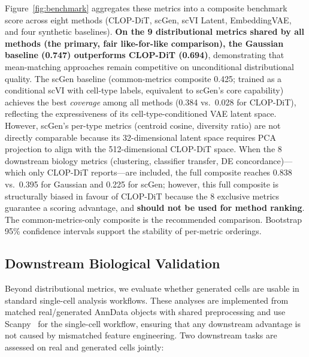 \documentclass[genes,article,submit,pdftex,oneauthor]{Definitions/mdpi}
\begin{document}
Figure~\ref{fig:benchmark} aggregates these metrics into a composite benchmark score across eight methods (CLOP-DiT, scGen, scVI Latent, EmbeddingVAE, and four synthetic baselines). \textbf{On the 9 distributional metrics shared by all methods (the primary, fair like-for-like comparison), the Gaussian baseline (0.747) outperforms CLOP-DiT (0.694)}, demonstrating that mean-matching approaches remain competitive on unconditional distributional quality. The scGen baseline (common-metrics composite 0.425; trained as a conditional scVI with cell-type labels, equivalent to scGen's core capability) achieves the best \emph{coverage} among all methods (0.384 vs.\ 0.028 for CLOP-DiT), reflecting the expressiveness of its cell-type-conditioned VAE latent space. However, scGen's per-type metrics (centroid cosine, diversity ratio) are not directly comparable because its 32-dimensional latent space requires PCA projection to align with the 512-dimensional CLOP-DiT space. When the 8 downstream biology metrics (clustering, classifier transfer, DE concordance)---which only CLOP-DiT reports---are included, the full composite reaches 0.838 vs.\ 0.395 for Gaussian and 0.225 for scGen; however, this full composite is structurally biased in favour of CLOP-DiT because the 8 exclusive metrics guarantee a scoring advantage, and \textbf{should not be used for method ranking}. The common-metrics-only composite is the recommended comparison. Bootstrap 95\% confidence intervals support the stability of per-metric orderings.

\subsection{Downstream Biological Validation}

Beyond distributional metrics, we evaluate whether generated cells are usable in standard single-cell analysis workflows. These analyses are implemented from matched real/generated AnnData objects with shared preprocessing and use Scanpy~\cite{ref-scanpy} for the single-cell workflow, ensuring that any downstream advantage is not caused by mismatched feature engineering. Two downstream tasks are assessed on real and generated cells jointly:
\end{document}
